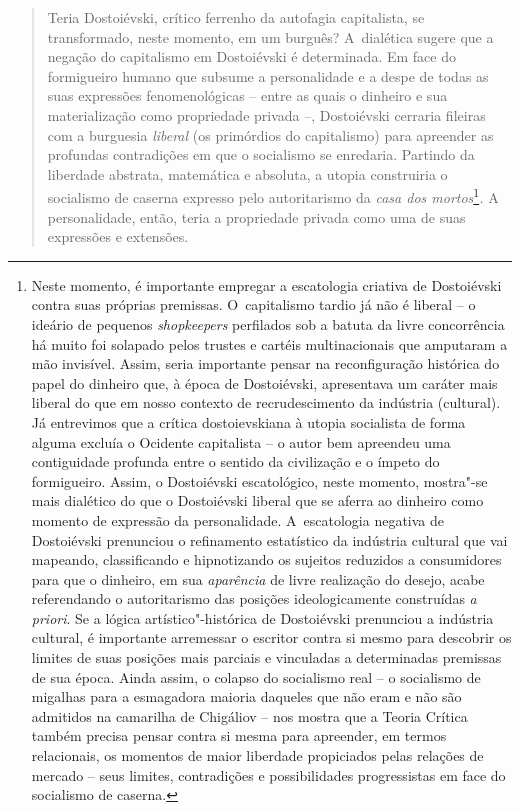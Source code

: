 {\begin{quote}
Teria Dostoiévski, crítico ferrenho da autofagia capitalista, se
transformado, neste momento, em um burguês? A~dialética sugere que a
negação do capitalismo em Dostoiévski é determinada. Em face do
formigueiro humano que subsume a personalidade e a despe de todas as
suas expressões fenomenológicas -- entre as quais o dinheiro e sua
materialização como propriedade privada --, Dostoiévski cerraria
fileiras com a burguesia \emph{liberal} (os primórdios do capitalismo)
para apreender as profundas contradições em que o socialismo se
enredaria. Partindo da liberdade abstrata, matemática e absoluta, a
utopia construiria o socialismo de caserna expresso pelo autoritarismo
da \emph{casa dos mortos}\footnote{Neste momento, é importante empregar
  a escatologia criativa de Dostoiévski contra suas próprias premissas.
  O~capitalismo tardio já não é liberal -- o ideário de pequenos
  \emph{shopkeepers} perfilados sob a batuta da livre concorrência há
  muito foi solapado pelos trustes e cartéis multinacionais que
  amputaram a mão invisível. Assim, seria importante pensar na
  reconfiguração histórica do papel do dinheiro que, à época de
  Dostoiévski, apresentava um caráter mais liberal do que em nosso
  contexto de recrudescimento da indústria (cultural). Já entrevimos que
  a crítica dostoievskiana à utopia socialista de forma alguma excluía o
  Ocidente capitalista -- o autor bem apreendeu uma contiguidade
  profunda entre o sentido da civilização e o ímpeto do formigueiro.
  Assim, o Dostoiévski escatológico, neste momento, mostra"-se mais
  dialético do que o Dostoiévski liberal que se aferra ao dinheiro como
  momento de expressão da personalidade. A~escatologia negativa de
  Dostoiévski prenunciou o refinamento estatístico da indústria cultural
  que vai mapeando, classificando e hipnotizando os sujeitos reduzidos a
  consumidores para que o dinheiro, em sua \emph{aparência} de livre
  realização do desejo, acabe referendando o autoritarismo das posições
  ideologicamente construídas \emph{a priori}. Se a lógica
  artístico"-histórica de Dostoiévski prenunciou a indústria cultural, é
  importante arremessar o escritor contra si mesmo para descobrir os
  limites de suas posições mais parciais e vinculadas a determinadas
  premissas de sua época. Ainda assim, o colapso do socialismo real -- o
  socialismo de migalhas para a esmagadora maioria daqueles que não eram
  e não são admitidos na camarilha de Chigáliov -- nos mostra que a
  Teoria Crítica também precisa pensar contra si mesma para apreender,
  em termos relacionais, os momentos de maior liberdade propiciados
  pelas relações de mercado -- seus limites, contradições e
  possibilidades progressistas em face do socialismo de caserna.}\emph{.}
A personalidade, então, teria a propriedade privada como uma de suas
expressões e extensões.


\end{quote}}
